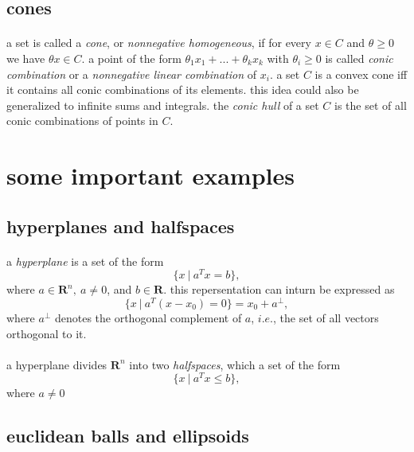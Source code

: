 \documentclass{article}
\begin{document}
  \subsection{cones}
    \paragraph{} a set is called a \textit{cone}, or \textit{nonnegative homogeneous}, if for every $x \in C$ and $\theta \ge 0$ we have $\theta x \in C$. a point of the form $\theta_1 x_1 + ... + \theta_k x_k$ with $\theta_i \ge 0$ is called \textit{conic combination} or a \textit{nonnegative linear combination} of $x_i$. a set $C$ is a convex cone iff it contains all conic combinations of its elements. this idea could also be generalized to infinite sums and integrals. the \textit{conic hull} of a set $C$ is the set of all conic combinations of points in $C$.

\section{some important examples}
  \subsection{hyperplanes and halfspaces}
    \paragraph{} a \textit{hyperplane} is a set of the form
    \begin{equation}
      \{x\ |\ a^Tx = b\},
    \end{equation}
    where $a \in \mathbf{R}^n,\ a \neq 0$, and $b \in \mathbf{R}$. this repersentation can inturn be expressed as
    \begin{equation}
      \{x\ |\ a^T(x - x_0) = 0\} = x_0 + a^{\perp},
    \end{equation}
    where $a^{\perp}$ denotes the orthogonal complement of $a$, $i.e.$, the set of all vectors orthogonal to it.
    \paragraph{} a hyperplane divides $\mathbf{R}^n$ into two \textit{halfspaces}, which a set of the form
    \begin{equation}
      \{x\ |\ a^Tx \leq b\},
    \end{equation}
    where $a \neq 0$
  \subsection{euclidean balls and ellipsoids}
\end{document}
